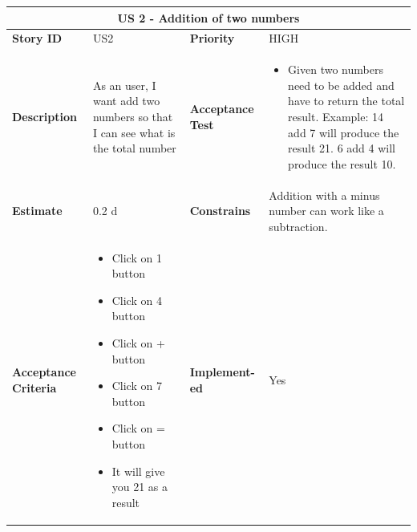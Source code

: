 \documentclass{article}
\begin{document}
\begin{tabular}{ |p{2cm}|p{5cm}|p{2cm}|p{4cm}| }
 \hline
 \multicolumn{4}{|c|}{US 2 - Addition of two numbers} \\
 \hline
 \textbf {Story ID}& US2 &  \textbf{Priority} & HIGH \\
 \hline
  \textbf{Description}   & As an user, I want add two numbers so that I can see what is the total number &    \textbf{Acceptance Test}& 
\begin{itemize}
\item Given two numbers need to be added and have to return the total result. Example: 14 add 7 will produce the result 21. 6 add 4 will produce the result 10. 
\end{itemize}
  \\
 \hline
 \textbf{Estimate} & 0.2 d &  \textbf{Constrains}&   Addition with a minus number can work like a subtraction.\\
 \hline
 \textbf{Acceptance Criteria} & 
 \begin{itemize}
\item Click on 1 button
\item Click on 4 button
\item Click on + button
\item Click on 7 button
\item Click on = button
\item It will give you 21 as a result 
\end{itemize}
 &  \textbf{Implement- ed}& Yes  \\
 \hline
\end{tabular}
\end{document}
